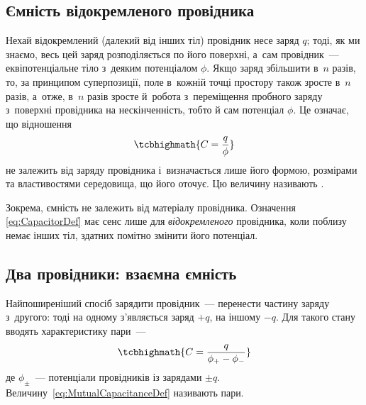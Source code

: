 \subsection*{Ємність відокремленого провідника}


Нехай відокремлений (далекий від інших тіл) провідник несе заряд $q$; тоді, як ми знаємо,
весь цей заряд розподіляється по його поверхні, а~сам провідник~--- еквіпотенціальне тіло
з~деяким потенціалом $\phi$. Якщо заряд збільшити в~$n$ разів, то, за принципом
суперпозиції, поле в~кожній точці простору також зросте в~$n$ разів, а~отже, в~$n$ разів
зросте й~робота з~переміщення пробного заряду з~поверхні провідника на нескінченність,
тобто й сам потенціал $\phi$. Це означає, що відношення
\begin{equation}\label{eq:CapacitorDef}
	\tcbhighmath{
		C = \frac{q}{\phi}
	}
\end{equation}
не залежить від заряду провідника і~визначається лише його формою, розмірами та
властивостями середовища, що його оточує. Цю величину називають .

Зокрема, ємність не залежить від матеріалу провідника. Означення
\eqref{eq:CapacitorDef} має сенс лише для \emph{відокремленого} провідника, коли поблизу
немає інших тіл, здатних помітно змінити його потенціал.



\subsection*{Два провідники: взаємна ємність}


Найпоширеніший спосіб зарядити провідник~--- перенести частину заряду з~другого: тоді на
одному з'являється заряд \(+q\), на іншому \(-q\). Для такого стану вводять характеристику пари~---
\begin{equation}\label{eq:MutualCapacitanceDef}
	\tcbhighmath{
		C = \frac{q}{\phi_+ - \phi_-}
	}
\end{equation}
де \(\phi_\pm\)~--- потенціали провідників із зарядами \(\pm q\).
Величину~\eqref{eq:MutualCapacitanceDef} називають  пари.

